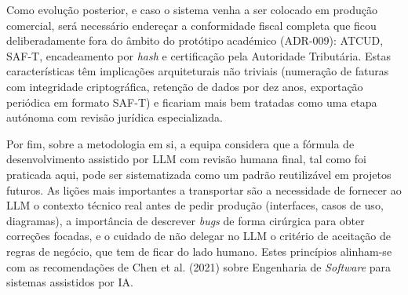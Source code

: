     Como evolução posterior, e caso o sistema venha a ser colocado em produção comercial, será necessário endereçar a conformidade fiscal completa que ficou deliberadamente fora do âmbito do protótipo académico (ADR-009): ATCUD, SAF-T, encadeamento por \textit{hash} e certificação pela Autoridade Tributária. Estas características têm implicações arquiteturais não triviais (numeração de faturas com integridade criptográfica, retenção de dados por dez anos, exportação periódica em formato SAF-T) e ficariam mais bem tratadas como uma etapa autónoma com revisão jurídica especializada.

    Por fim, sobre a metodologia em si, a equipa considera que a fórmula de desenvolvimento assistido por LLM com revisão humana final, tal como foi praticada aqui, pode ser sistematizada como um padrão reutilizável em projetos futuros. As lições mais importantes a transportar são a necessidade de fornecer ao LLM o contexto técnico real antes de pedir produção (interfaces, casos de uso, diagramas), a importância de descrever \textit{bugs} de forma cirúrgica para obter correções focadas, e o cuidado de não delegar no LLM o critério de aceitação de regras de negócio, que tem de ficar do lado humano. Estes princípios alinham-se com as recomendações de Chen et al. (2021) sobre Engenharia de \textit{Software} para sistemas assistidos por IA.
